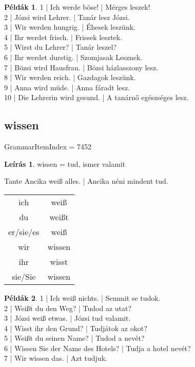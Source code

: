 \documentclass{article}
\theoremstyle{definition}
\newtheorem*{exmp}{Példák}
\newtheorem*{desc}{Leírás}
\begin{document}
\begin{exmp}
1 | Ich werde böse! | Mérges leszek!\\
2 | Józsi wird Lehrer. | Tanár lesz Józsi.\\
3 | Wir werden hungrig. | Éhesek leszünk.\\
4 | Ihr werdet frisch. | Frissek lesztek.\\
5 | Wirst du Lehrer? | Tanár leszel?\\
6 | Ihr werdet durstig. | Szomjasak Lesznek.\\
7 | Bözsi wird Hausfrau. | Bözsi házlasszony lesz.\\
8 | Wir werden reich. | Gazdagok leszünk.\\
9 | Anna wird müde. | Anna fáradt lesz.\\
10 | Die Lehrerin wird gesund. | A tanárnő egészséges lesz.\\
\end{exmp}

\subsection{wissen}

GrammarItemIndex = 7452

\begin{desc}
wissen = tud, ismer valamit

Tante Ancika weiß alles. | Ancika néni mindent tud.

\begin{tabular}{cc}
 ich & weiß \\
 du & weißt \\
 er/sie/es & weiß \\
 wir & wissen \\
 ihr & wisst \\
 sie/Sie & wissen \\
\end{tabular}
\end{desc}

\begin{exmp}
1 | Ich weiß nichts. | Semmit se tudok.\\
2 | Weißt du den Weg? | Tudod az utat?\\
3 | Józsi weiß etwas. | Józsi tud valamit.\\
4 | Wisst ihr den Grund? | Tudjátok az okot?\\
5 | Weißt du seinen Name? | Tudod a nevét?\\
6 | Wissen Sie der Name des Hotels? | Tudja a hotel nevét?\\
7 | Wir wissen das. | Azt tudjuk.\\
\end{exmp}
\end{document}

